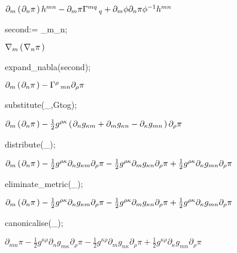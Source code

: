 \documentclass[10pt]{article}
\newcommand\brwrap[3]{%
  \setbox0=\hbox{$#2$}
  \left#1\vbox to \the\ht0{\hbox to 0pt{}}\right.\kern-.2em
  \begingroup #2\endgroup\kern-.15em
  \left.\vbox to \the\ht0{\hbox to 0pt{}}\right#3
}
\begin{document}
\begin{adjustwidth}{1em}{0cm}${}\partial_{m}\brwrap{(}{\partial_{n}{\pi}}{)} h^{m n}-\partial_{m}{\pi} \Gamma^{m q}\,_{q}+\partial_{m}{\phi} \partial_{n}{\pi} {\phi}^{-1} h^{m n}$\end{adjustwidth}
\begin{python}
second:= \nabla_{m}{\nabla_{n}{\pi}};
\end{python}
\begin{adjustwidth}{1em}{0cm}${}\nabla_{m}\brwrap{(}{\nabla_{n}{\pi}}{)}$\end{adjustwidth}
\begin{python}
expand_nabla(second);
\end{python}
\begin{adjustwidth}{1em}{0cm}${}\partial_{m}\brwrap{(}{\partial_{n}{\pi}}{)}-\Gamma^{\rho}\,_{m n} \partial_{\rho}{\pi}$\end{adjustwidth}
\begin{python}
substitute(_,Gtog);
\end{python}
\begin{adjustwidth}{1em}{0cm}${}\partial_{m}\brwrap{(}{\partial_{n}{\pi}}{)} - \frac{1}{2}g^{\rho \kappa} \brwrap{(}{\partial_{n}{g_{\kappa m}}+\partial_{m}{g_{\kappa n}}-\partial_{\kappa}{g_{m n}}}{)} \partial_{\rho}{\pi}$\end{adjustwidth}
\begin{python}
distribute(_);
\end{python}
\begin{adjustwidth}{1em}{0cm}${}\partial_{m}\brwrap{(}{\partial_{n}{\pi}}{)} - \frac{1}{2}g^{\rho \kappa} \partial_{n}{g_{\kappa m}} \partial_{\rho}{\pi} - \frac{1}{2}g^{\rho \kappa} \partial_{m}{g_{\kappa n}} \partial_{\rho}{\pi}+\frac{1}{2}g^{\rho \kappa} \partial_{\kappa}{g_{m n}} \partial_{\rho}{\pi}$\end{adjustwidth}
\begin{python}
eliminate_metric(_);
\end{python}
\begin{adjustwidth}{1em}{0cm}${}\partial_{m}\brwrap{(}{\partial_{n}{\pi}}{)} - \frac{1}{2}g^{\rho \kappa} \partial_{n}{g_{\kappa m}} \partial_{\rho}{\pi} - \frac{1}{2}g^{\rho \kappa} \partial_{m}{g_{\kappa n}} \partial_{\rho}{\pi}+\frac{1}{2}g^{\rho \kappa} \partial_{\kappa}{g_{m n}} \partial_{\rho}{\pi}$\end{adjustwidth}
\begin{python}
canonicalise(_);
\end{python}
\begin{adjustwidth}{1em}{0cm}${}\partial_{m n}{\pi} - \frac{1}{2}g^{\kappa \rho} \partial_{n}{g_{m \kappa}} \partial_{\rho}{\pi} - \frac{1}{2}g^{\kappa \rho} \partial_{m}{g_{n \kappa}} \partial_{\rho}{\pi}+\frac{1}{2}g^{\kappa \rho} \partial_{\kappa}{g_{m n}} \partial_{\rho}{\pi}$\end{adjustwidth}
\end{document}
